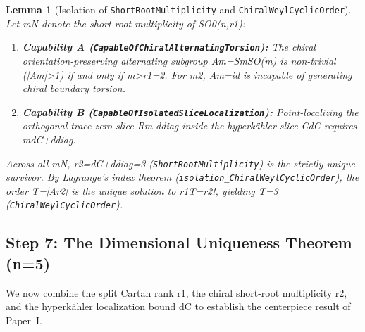 \documentclass[11pt,reqno]{amsart}
\newtheorem{lemma}[theorem]{Lemma}
\theoremstyle{definition}
\theoremstyle{remark}
\begin{document}
\begin{lemma}[Isolation of \texttt{ShortRootMultiplicity} and \texttt{ChiralWeylCyclicOrder}]
\label{lem:short_root}
Let mN denote the short-root multiplicity of SO0(n,r1):
\begin{enumerate}[label=(\alph*)]
  \item \textbf{Capability A (\texttt{CapableOfChiralAlternatingTorsion}):} The chiral orientation-preserving alternating subgroup Am=SmSO(m) is non-trivial (|Am|>1) if and only if m>r1=2. For m2, Am={id} is incapable of generating chiral boundary torsion.
  \item \textbf{Capability B (\texttt{CapableOfIsolatedSliceLocalization}):} Point-localizing the orthogonal trace-zero slice Rm-ddiag inside the hyperk\"ahler slice CdC requires mdC+ddiag.
\end{enumerate}
Across all mN, r2=dC+ddiag=3 (\texttt{ShortRootMultiplicity}) is the strictly unique survivor. By Lagrange's index theorem (\texttt{isolation\_ChiralWeylCyclicOrder}), the order T=|Ar2| is the unique solution to r1T=r2!, yielding T=3 (\texttt{ChiralWeylCyclicOrder}).
\end{lemma}

\subsection{Step 7: The Dimensional Uniqueness Theorem (n=5)}

We now combine the split Cartan rank r1, the chiral short-root multiplicity r2, and the hyperk\"ahler localization bound dC to establish the centerpiece result of Paper~I.
\end{document}
